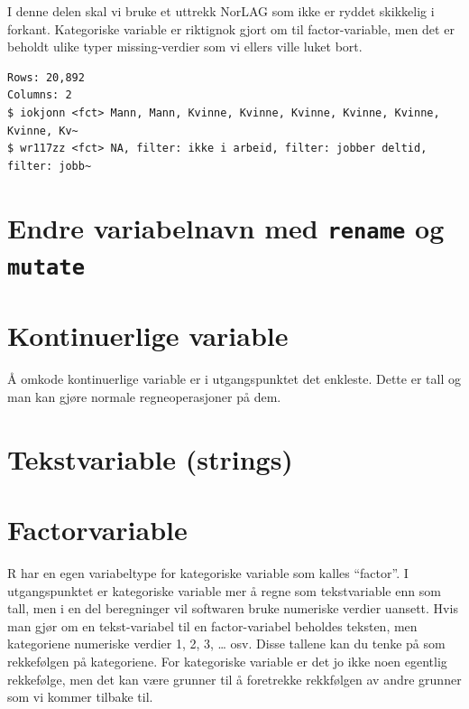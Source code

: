 \documentclass[
  letterpaper,
  DIV=11,
  numbers=noendperiod]{scrreprt}
\theoremstyle{definition}
\theoremstyle{remark}
\begin{document}
I denne delen skal vi bruke et uttrekk NorLAG som ikke er ryddet
skikkelig i forkant. Kategoriske variable er riktignok gjort om til
factor-variable, men det er beholdt ulike typer missing-verdier som vi
ellers ville luket bort.

\begin{verbatim}
Rows: 20,892
Columns: 2
$ iokjonn <fct> Mann, Mann, Kvinne, Kvinne, Kvinne, Kvinne, Kvinne, Kvinne, Kv~
$ wr117zz <fct> NA, filter: ikke i arbeid, filter: jobber deltid, filter: jobb~
\end{verbatim}

\hypertarget{endre-variabelnavn-med-rename-og-mutate}{%
\section{\texorpdfstring{Endre variabelnavn med \texttt{rename} og
\texttt{mutate}}{Endre variabelnavn med rename og mutate}}\label{endre-variabelnavn-med-rename-og-mutate}}

\hypertarget{kontinuerlige-variable-1}{%
\section{Kontinuerlige variable}\label{kontinuerlige-variable-1}}

Å omkode kontinuerlige variable er i utgangspunktet det enkleste. Dette
er tall og man kan gjøre normale regneoperasjoner på dem.

\hypertarget{tekstvariable-strings}{%
\section{Tekstvariable (strings)}\label{tekstvariable-strings}}

\hypertarget{factorvariable}{%
\section{Factorvariable}\label{factorvariable}}

R har en egen variabeltype for kategoriske variable som kalles
``factor''. I utgangspunktet er kategoriske variable mer å regne som
tekstvariable enn som tall, men i en del beregninger vil softwaren bruke
numeriske verdier uansett. Hvis man gjør om en tekst-variabel til en
factor-variabel beholdes teksten, men kategoriene numeriske verdier 1,
2, 3, \ldots{} osv. Disse tallene kan du tenke på som rekkefølgen på
kategoriene. For kategoriske variable er det jo ikke noen egentlig
rekkefølge, men det kan være grunner til å foretrekke rekkfølgen av
andre grunner som vi kommer tilbake til.
\end{document}

